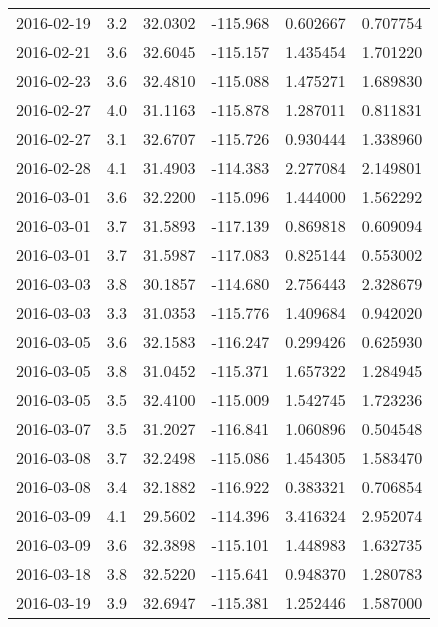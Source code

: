\begin{tabular}{lrrrrr}
2016-02-19 &       3.2 &  32.0302 &  -115.968 &         0.602667 &         0.707754 \\
2016-02-21 &       3.6 &  32.6045 &  -115.157 &         1.435454 &         1.701220 \\
2016-02-23 &       3.6 &  32.4810 &  -115.088 &         1.475271 &         1.689830 \\
2016-02-27 &       4.0 &  31.1163 &  -115.878 &         1.287011 &         0.811831 \\
2016-02-27 &       3.1 &  32.6707 &  -115.726 &         0.930444 &         1.338960 \\
2016-02-28 &       4.1 &  31.4903 &  -114.383 &         2.277084 &         2.149801 \\
2016-03-01 &       3.6 &  32.2200 &  -115.096 &         1.444000 &         1.562292 \\
2016-03-01 &       3.7 &  31.5893 &  -117.139 &         0.869818 &         0.609094 \\
2016-03-01 &       3.7 &  31.5987 &  -117.083 &         0.825144 &         0.553002 \\
2016-03-03 &       3.8 &  30.1857 &  -114.680 &         2.756443 &         2.328679 \\
2016-03-03 &       3.3 &  31.0353 &  -115.776 &         1.409684 &         0.942020 \\
2016-03-05 &       3.6 &  32.1583 &  -116.247 &         0.299426 &         0.625930 \\
2016-03-05 &       3.8 &  31.0452 &  -115.371 &         1.657322 &         1.284945 \\
2016-03-05 &       3.5 &  32.4100 &  -115.009 &         1.542745 &         1.723236 \\
2016-03-07 &       3.5 &  31.2027 &  -116.841 &         1.060896 &         0.504548 \\
2016-03-08 &       3.7 &  32.2498 &  -115.086 &         1.454305 &         1.583470 \\
2016-03-08 &       3.4 &  32.1882 &  -116.922 &         0.383321 &         0.706854 \\
2016-03-09 &       4.1 &  29.5602 &  -114.396 &         3.416324 &         2.952074 \\
2016-03-09 &       3.6 &  32.3898 &  -115.101 &         1.448983 &         1.632735 \\
2016-03-18 &       3.8 &  32.5220 &  -115.641 &         0.948370 &         1.280783 \\
2016-03-19 &       3.9 &  32.6947 &  -115.381 &         1.252446 &         1.587000 \\

\end{tabular}
